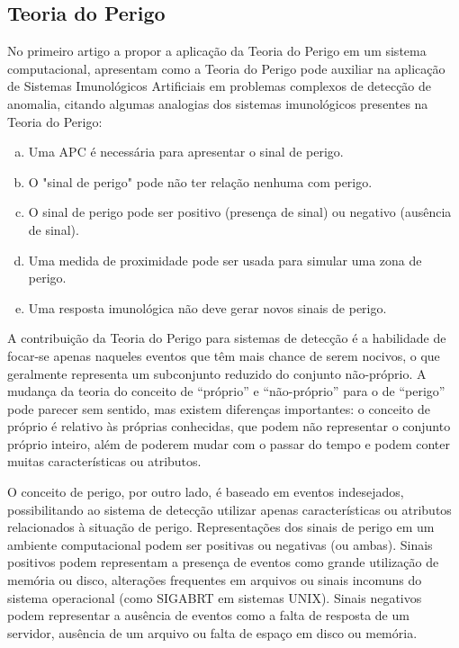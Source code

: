 \subsection{Teoria do Perigo}

No primeiro artigo a propor a aplicação da Teoria do Perigo em um sistema computacional, \citet{Aickelin2002} apresentam como a Teoria do Perigo pode auxiliar na aplicação de Sistemas Imunológicos Artificiais em problemas complexos de detecção de anomalia, citando algumas analogias dos sistemas imunológicos presentes na Teoria do Perigo:

\begin{enumerate}[a)]
    \item Uma APC é necessária para apresentar o sinal de perigo.
    \item O "sinal de perigo" pode não ter relação nenhuma com perigo.
    \item O sinal de perigo pode ser positivo (presença de sinal) ou negativo (ausência de sinal).
    \item Uma medida de proximidade pode ser usada para simular uma zona de perigo.
    \item Uma resposta imunológica não deve gerar novos sinais de perigo.
\end{enumerate}

A contribuição da Teoria do Perigo para sistemas de detecção é a habilidade de focar-se apenas naqueles eventos que têm mais chance de serem nocivos, o que geralmente representa um subconjunto reduzido do conjunto não-próprio. A mudança da teoria do conceito de ``próprio'' e ``não-próprio'' para o de ``perigo'' pode parecer sem sentido, mas existem diferenças importantes: o conceito de próprio é relativo às próprias conhecidas, que podem não representar o conjunto próprio inteiro, além de poderem mudar com o passar do tempo e podem conter muitas características ou atributos.

O conceito de perigo, por outro lado, é baseado em eventos indesejados, possibilitando ao sistema de detecção utilizar apenas características ou atributos relacionados à situação de perigo. Representações dos sinais de perigo em um ambiente computacional podem ser positivas ou negativas (ou ambas). Sinais positivos podem representam a presença de eventos como grande utilização de memória ou disco, alterações frequentes em arquivos ou sinais incomuns do sistema operacional (como SIGABRT em sistemas UNIX). Sinais negativos podem representar a ausência de eventos como a falta de resposta de um servidor, ausência de um arquivo ou falta de espaço em disco ou memória.

